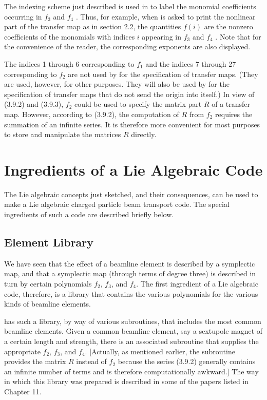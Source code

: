      The indexing scheme just described is used in  to label the
monomial coefficients occurring in $f_3$  and $f_4$ .  Thus, for example, when
 is asked to print the nonlinear part of the transfer map as in
section 2.2, the quantities $f(i)$ are the nonzero coefficients of the
monomials with indices $i$ appearing in $f_3$  and $f_4$ .  Note that for the
convenience of the reader, the corresponding exponents are also displayed.

     The indices 1 through 6 corresponding to $f_1$  and the indices 7 through
27 corresponding to $f_2$ are not used by  for the specification of
transfer maps.  (They are used, however, for other purposes.  They will
also be used by  for the specification of transfer maps that do
not send  the origin into itself.)  In view of (3.9.2) and (3.9.3), $f_2$
could be used to specify the matrix part $R$ of a transfer map.  However,
according to (3.9.2), the computation of $R$ from $f_2$  requires the summation
of an infinite series.  It is therefore more convenient for most purposes
to store and manipulate the matrices $R$ directly.

\section{Ingredients of a Lie Algebraic Code}
\label{ingredients}
     The Lie algebraic concepts just sketched, and their consequences, can
be used to make a Lie algebraic charged particle beam transport code.  The
special ingredients of such a code are described briefly below.

\subsection{Element Library}
     We have seen that the effect of a beamline element is described by a
symplectic map, and that a symplectic map (through terms of degree three)
is described in turn by certain polynomials $f_2$, $f_3$, and $f_4$.  The first
ingredient  of a Lie algebraic code, therefore, is a library that contains
the various polynomials for the various kinds of beamline elements.

     \Mary has such a library, by way of various subroutines, that
includes the most common beamline elements.  Given a common beamline element, say a
sextupole magnet of a certain length and strength, there is an associated
subroutine that supplies the appropriate $f_2$, $f_3$, and $f_4$.  [Actually, as
mentioned earlier, the subroutine provides the matrix $R$ instead of $f_2$
because the series (3.9.2) generally contains an infinite number of terms
and is therefore computationally awkward.]  The way in which this library
was prepared is described in some of the papers listed in Chapter 11. 

